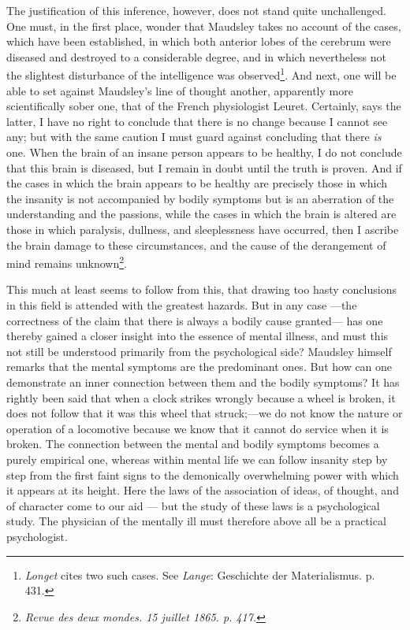 \documentclass[12pt,a4paper,openany]{book}
\newcommand{\opage}[1]{\marginnote{\footnotesize\textit{[#1]}}}
\begin{document}
The justification of this inference, however, does not stand quite
unchallenged. One must, in the first place, wonder that
Maudsley takes no account of the cases, which have been
established, in which both anterior lobes of the cerebrum
were diseased and destroyed to a considerable degree, and in which nevertheless
not the slightest disturbance of the intelligence was observed\footnote{\emph{Longet} cites two such cases. See \emph{Lange}: Geschichte der Materialismus. p. 431.}.
And next, one will be able to set against Maudsley's line of thought
another, apparently more scientifically sober one, that of
\opage{324}the French physiologist Leuret. Certainly, says the latter,
I have no right to conclude that there is no change
because I cannot see any; but with the same caution
I must guard against concluding that there \emph{is} one. When
the brain of an insane person appears to be healthy, I do not conclude
that this brain is diseased, but I remain in doubt until
the truth is proven. And if the cases in which the brain
appears to be healthy are precisely those in which the insanity is not
accompanied by bodily symptoms but is an aberration of
the understanding and the passions, while the cases in which
the brain is altered are those in which paralysis,
dullness, and sleeplessness have occurred, then I ascribe the brain damage
to these circumstances, and the cause of the derangement of mind
remains unknown\footnote{\textit{Revue des deux mondes. 15 juillet 1865. p. 417.}}.

This much at least seems to follow from this, that
drawing too hasty conclusions in this field is attended with the greatest
hazards. But in any case
---the correctness of the claim that there is always a bodily cause granted---
has one thereby gained a closer insight into
the essence of mental illness, and must this not still
be understood primarily from the psychological side? Maudsley himself
remarks that the mental symptoms are the predominant ones.
But how can one demonstrate an inner connection between
them and the bodily symptoms? It has rightly been
said that when a clock strikes wrongly because a wheel is
broken, it does not follow that it was this wheel that
struck;---we do not know the nature or operation of a locomotive
because we know that it cannot do service when it is
broken. The connection between the mental and bodily
symptoms becomes a purely empirical one, whereas within
mental life we can follow insanity step by step
from the first faint signs to the demonically overwhelming
power with which it appears at its height. Here
\opage{325}the laws of the association of ideas, of thought, and of character come
to our aid --- but the study of these laws is a psychological study.
The physician of the mentally ill must therefore above all be a practical
psychologist.
\end{document}
